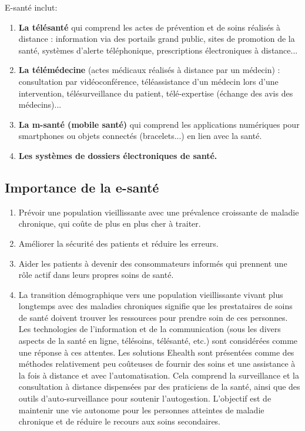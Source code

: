 \documentclass[12pt]{article}
\begin{document}
E-santé inclut:
\begin{enumerate}
	\item \textbf{La télésanté} qui comprend les actes de prévention et de soins réalisés à distance : information via des portails grand public, sites de promotion de la santé, systèmes d'alerte téléphonique, prescriptions électroniques à distance...
	\item \textbf{La télémédecine} (actes médicaux réalisés à distance par un médecin) : consultation par vidéoconférence, téléassistance d'un médecin lors d'une intervention, télésurveillance du patient, télé-expertise (échange des avis des médecins)...
	\item \textbf{La m-santé (mobile santé)} qui comprend les applications numériques pour smartphones ou objets connectés (bracelets...) en lien avec la santé.
	\item \textbf{Les systèmes de dossiers électroniques de santé.}
\end{enumerate}

\subsection{Importance de la e-santé}
\begin{enumerate}
	\item Prévoir une population vieillissante avec une prévalence croissante de maladie chronique, qui coûte de plus en plus cher à traiter.
	\item Améliorer la sécurité des patients et réduire les erreurs.
	\item Aider les patients à devenir des consommateurs informés qui prennent une rôle actif dans leurs propres soins de santé.
	\item La transition démographique vers une population vieillissante vivant plus longtemps avec des maladies chroniques signifie que les prestataires de soins de santé doivent trouver les ressources pour prendre soin de ces personnes. Les technologies de l’information et de la communication (sous les divers aspects de la santé en ligne, télésoins, télésanté, etc.) sont considérées comme une réponse à ces attentes. Les solutions Ehealth sont présentées comme des méthodes relativement peu coûteuses de fournir des soins et une assistance à la fois à distance et avec l’automatisation. Cela comprend la surveillance et la consultation à distance dispensées par des praticiens de la santé, ainsi que des outils d'auto-surveillance pour soutenir l'autogestion. L’objectif est de maintenir une vie autonome pour les personnes atteintes de maladie chronique et de réduire le recours aux soins secondaires.
\end{enumerate}
\end{document}
